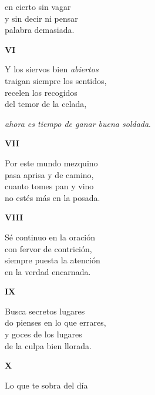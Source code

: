 \documentclass[11pt,twoside]{article}
\begin{document}
en cierto sin vagar\\
y sin decir ni pensar\\
palabra demasiada.\par
\poend
\repage
%
\begin{center}
\textbf{VI}
\end{center}
\postart
Y los siervos bien \emph{abiertos}\\
traigan siempre los sentidos,\\
recelen los recogidos\\
del temor de la celada,\par
\emph{ahora es tiempo de ganar buena soldada}.\par
\poend
%
\begin{center}
\textbf{VII}
\end{center}
\postart
Por este mundo mezquino\\
pasa aprisa y de camino,\\
cuanto tomes pan y vino\\
no estés más en la posada.\par
\poend
%
\begin{center}
\textbf{VIII}
\end{center}
\postart
Sé continuo en la oración\\
con fervor de contrición,\\
siempre puesta la atención\\
en la verdad encarnada.\par
\poend
%
\begin{center}
\textbf{IX}
\end{center}
\postart
Busca secretos lugares\\
do pienses en lo que errares,\\
y goces de los lugares\\
de la culpa bien llorada.\par
\poend
%
\begin{center}
\textbf{X}
\end{center}
\postart
Lo que te sobra del día\\
\end{document}
